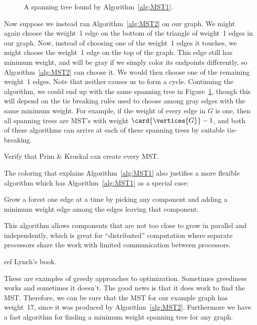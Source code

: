 \begin{figure}


\caption{A spanning tree found by Algorithm~\ref{alg:MST1}.}

\label{fig:5KC}

\end{figure}

Now suppose we instead ran Algorithm~\ref{alg:MST2} on our graph.  We
might again choose the weight~1 edge on the bottom of the triangle of
weight~1 edges in our graph.  Now, instead of choosing one of the
weight~1 edges it touches, we might choose the weight~1 edge on the
top of the graph.  This edge still has minimum weight, and will be
gray if we simply color its endpoints differently, so
Algorithm~\ref{alg:MST2} can choose it.  We would then choose one of
the remaining weight~1 edges.  Note that neither causes us to form a
cycle.  Continuing the algorithm, we could end up with the same
spanning tree in Figure~\ref{fig:5KC}, though this will depend on
the tie breaking rules used to choose among gray edges with the same
minimum weight.  For example, if the weight of every edge in $G$ is
one, then all spanning trees are MST's with weight
$\card{\vertices{G}}-1$, and both of these algorithms can arrive at
each of these spanning trees by suitable tie-breaking.

\begin{editingnotes}
Verify that Prim \& Kruskal can create every MST.
\end{editingnotes}

The coloring that explains Algorithm~\ref{alg:MST1} also justifies a more
flexible algorithm which has Algorithm~\ref{alg:MST1} as a special case:
\begin{algorithm}\label{alg:MST3}
  Grow a forest one edge at a time by picking any component and adding a
  minimum weight edge among the edges leaving that component.
\end{algorithm}
This algorithm allows components that are not too close to grow in
parallel and independently, which is great for ``distributed'' computation
where separate processors share the work with limited communication
between processors.

\begin{editingnotes}
ref Lynch's book.
\end{editingnotes}

These are examples of greedy approaches to optimization.  Sometimes
greediness works and sometimes it doesn't.  The good news is that it
does work to find the MST.  Therefore, we can be sure that the MST for
our example graph has weight~17, since it was produced by
Algorithm~\ref{alg:MST2}.  Furthermore we have a fast algorithm for
finding a minimum weight spanning tree for any graph.

